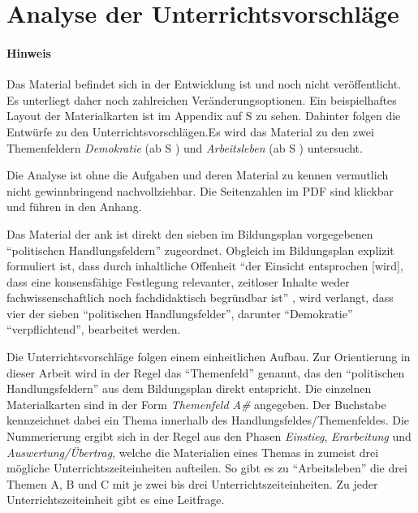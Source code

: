 \section{Analyse der Unterrichtsvorschläge \label{Analyse}}
\paragraph{Hinweis}
Das Material befindet sich in der Entwicklung ist und noch nicht veröffentlicht. Es unterliegt daher noch zahlreichen Veränderungsoptionen. 
Ein beispielhaftes Layout der Materialkarten ist im Appendix auf \acrlong{S} \pageref{ANKPrototyp} zu sehen. Dahinter folgen die Entwürfe zu den Unterrichtsvorschlägen.Es wird das Material zu den zwei Themenfeldern \emph{Demokratie} (ab \gls{S} \pageref{DEMOKRATIE-A1}) und \emph{Arbeitsleben} (ab \gls{S} \pageref{ARBEITSLEBEN-A1}) untersucht. 

\noindent Die Analyse ist ohne die Aufgaben und deren Material zu kennen vermutlich nicht gewinnbringend nachvollziehbar. Die Seitenzahlen im PDF sind klickbar und führen in den Anhang. 
\bigskip


Das Material der \gls{ank} ist direkt den sieben im Bildungsplan vorgegebenen \enquote{politischen Handlungsfeldern} \autocite[3, 15]{bplan} zugeordnet.
Obgleich im Bildungsplan explizit formuliert ist, dass durch inhaltliche Offenheit \enquote{der Einsicht entsprochen [wird], dass eine konsensfähige Festlegung relevanter, zeitloser Inhalte weder fachwissenschaftlich noch fachdidaktisch begründbar ist} \autocite[15]{bplan}, wird verlangt, dass vier der sieben \enquote{politischen Handlungsfelder}, darunter \enquote{Demokratie} \enquote{verpflichtend}, bearbeitet werden.

Die Unterrichtsvorschläge folgen einem einheitlichen Aufbau. Zur Orientierung in dieser Arbeit wird in der Regel das \enquote{Themenfeld} genannt, das den \enquote{politischen Handlungsfeldern} aus dem Bildungsplan direkt entspricht. 
Die einzelnen Materialkarten sind in der Form \emph{Themenfeld A\#} angegeben. 
Der Buchstabe kennzeichnet dabei ein Thema innerhalb des Handlungsfeldes/Themenfeldes.
Die Nummerierung ergibt sich in der Regel aus den Phasen \emph{Einstieg}, \emph{Erarbeitung} und \emph{Auswertung/Übertrag}, welche die Materialien eines Themas in zumeist drei mögliche Unterrichtszeiteinheiten aufteilen. So gibt es zu \enquote{Arbeitsleben} die drei Themen A, B und C mit je zwei bis drei Unterrichtszeiteinheiten.
Zu jeder Unterrichtszeiteinheit gibt es eine Leitfrage. %

